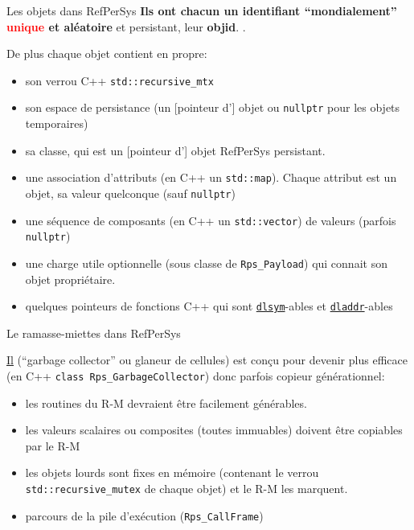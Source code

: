 \documentclass[final,a4,xcolor={svgnames,dvipsnames}]{beamer}
\begin{document}
 \begin{frame}{Les objets dans RefPerSys}
   \textbf{Ils ont chacun un identifiant ``mondialement''
     \textcolor{red}{unique} et aléatoire} et persistant, leur
   \textbf{objid}. .

   \medskip
   
   \begin{relsize}{-0.5}
   De plus chaque objet contient en propre:
   \begin{itemize}
   \item son verrou C++ \texttt{std::recursive\_mtx}
     \item son espace de persistance (un [pointeur d'] objet ou \texttt{nullptr} pour les objets temporaires)
     \item sa classe, qui est un [pointeur d'] objet RefPerSys persistant.
     \item une association d'attributs (en C++ un
       \texttt{std::map}). Chaque attribut est un objet, sa valeur
       quelconque (sauf \texttt{nullptr})
     \item une séquence de composants (en C++ un \texttt{std::vector}) de valeurs (parfois \texttt{nullptr})
       \item une charge utile optionnelle (sous classe de
         \texttt{Rps\_Payload}) qui connait son objet propriétaire.
       \item quelques pointeurs de fonctions C++ qui sont
         \href{https://man7.org/linux/man-pages/man3/dlsym.3.html}{\texttt{dlsym}}-ables
         et
         \href{https://man7.org/linux/man-pages/man3/dladdr.3.html}{\texttt{dladdr}}-ables
   \end{itemize}
   \end{relsize}
   \end{frame}

 \begin{frame}{Le ramasse-miettes dans RefPerSys}
   
   \href{https://fr.wikipedia.org/wiki/Ramasse-miettes_(informatique)}{Il}
   (``garbage collector'' ou glaneur de cellules) est conçu pour
   devenir plus efficace (en C++ \texttt{class Rps\_GarbageCollector})
   donc parfois copieur générationnel:

   \begin{itemize}
   \item les routines du R-M devraient être facilement générables.
   \item les valeurs scalaires ou composites (toutes immuables)
     doivent être copiables par le R-M
   \item les objets lourds sont fixes en mémoire (contenant le verrou \texttt{std::recursive\_mutex} de chaque objet) et le R-M les marquent.
     \item parcours de la pile d'exécution (\texttt{Rps\_CallFrame})
   \end{itemize}
 \end{frame}
 
\end{document}
